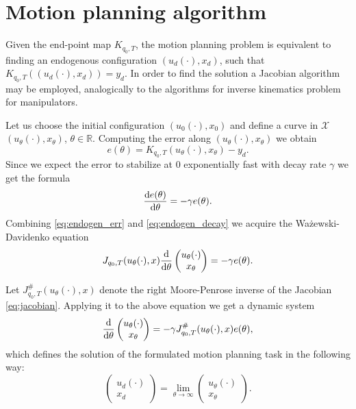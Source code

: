 \section{Motion planning algorithm}
Given the end-point map $K_{q_0, T}$, the motion planning problem is equivalent to finding an endogenous
configuration $(u_d(\cdot), x_d)$, such that $K_{q_0, T}((u_d(\cdot), x_d))=y_d$. In order to find the
solution a Jacobian algorithm may be employed, analogically to the algorithms
for inverse kinematics problem for manipulators. 

Let us choose the initial configuration $(u_0(\cdot), x_0)$ and
define a curve in $\mathcal{X}$ $(u_\theta(\cdot), x_\theta)$, $\theta \in \mathbb{R}$.
Computing the error along $(u_\theta(\cdot), x_\theta)$ we obtain
\begin{equation}
\label{eq:endogen_err}
e(\theta)=K_{q_0, T}(u_\theta(\cdot), x_\theta)-y_d.
\end{equation}
Since we expect the error to stabilize at $0$ exponentially fast with decay rate
$\gamma$ we get the formula
\begin{equation}
\label{eq:endogen_decay}
\frac{\mathrm{d} e(\theta)}{\mathrm{d} \theta}=-\gamma e(\theta).
\end{equation}
Combining \eqref{eq:endogen_err} and \eqref{eq:endogen_decay} we acquire the Ważewski-Davidenko equation
\begin{equation}
J_{q_0, T}(u_\theta(\cdot), x)\dfrac{\mathrm{d}}{\mathrm{d} \theta}\begin{pmatrix}
u_\theta(\cdot)\\ x_\theta
\end{pmatrix}=-\gamma e(\theta).
\end{equation}

Let $J^\#_{q_0, T}(u_\theta(\cdot), x)$ denote the right Moore-Penrose inverse \cite{ecs_ijc}
of the Jacobian \eqref{eq:jacobian}. Applying it to the above equation we get a dynamic system
\begin{equation}
\label{eq:endogen_alg}
\dfrac{\mathrm{d}}{\mathrm{d} \theta}\begin{pmatrix}
u_\theta(\cdot)\\ x_\theta
\end{pmatrix}=-\gamma J^\#_{q_0, T}(u_\theta(\cdot), x) e(\theta),
\end{equation}
which defines the solution of the formulated motion planning task in the following way:
\begin{equation}
\begin{pmatrix}
u_d(\cdot)\\ x_d
\end{pmatrix}=\lim_{\theta\rightarrow\infty}\begin{pmatrix}
u_\theta(\cdot)\\ x_\theta
\end{pmatrix}.
\end{equation}

